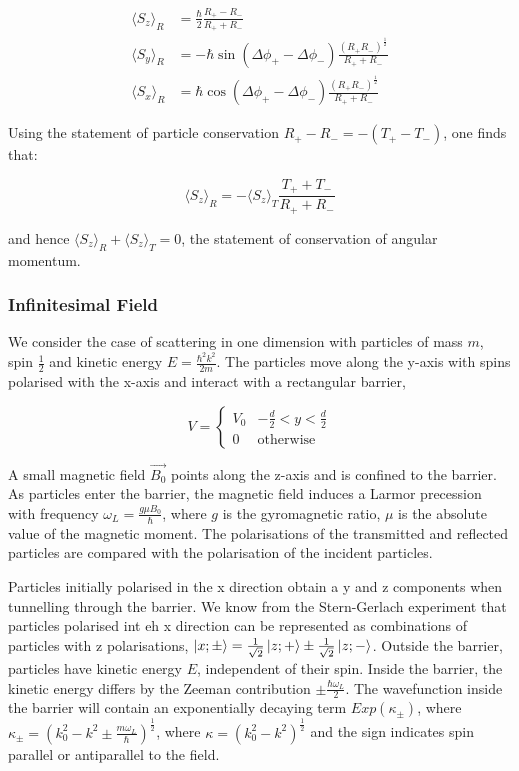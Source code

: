 \documentclass{article}
\begin{document}
\begin{align}
	\langle S_z \rangle_R &= \frac{\hbar}{2}\frac{R_+-R_-}{R_++R_-}\\
	\langle S_y \rangle_R &= -\hbar \sin{(\Delta\phi_+-\Delta\phi_-)}\frac{(R_+R_-)^{\frac{1}{2}}}{R_++R_-}\\
	\langle S_x \rangle_R &= \hbar \cos{(\Delta\phi_+-\Delta\phi_-)}\frac{(R_+R_-)^{\frac{1}{2}}}{R_++R_-}
\end{align}

\noindent Using the statement of particle conservation $R_+-R_-=-(T_+-T_-)$, one finds that:

\begin{equation}
	\langle S_z \rangle_R = -\langle S_z \rangle_T \frac{T_++T_-}{R_++R_-} 
\end{equation}

\noindent and hence $\langle S_z \rangle_R + \langle S_z \rangle_T = 0$, the statement of conservation of angular momentum. 

\subsubsection{Infinitesimal Field}

We consider the case of scattering in one dimension with particles of mass $m$, spin $\frac{1}{2}$ and kinetic energy $
E = \frac{\hbar^2k^2}{2m}$. The particles move along the y-axis with spins polarised with the x-axis and interact with a rectangular barrier,

\begin{equation}
	V = 
	\begin{cases}
	V_0 & -\frac{d}{2}<y<\frac{d}{2}\\
		0 & \text{otherwise}
	\end{cases}
\end{equation}

A small magnetic field $\vec{B_{0}}$ points along the z-axis and is confined to the barrier. As particles enter the barrier, the magnetic field induces a Larmor precession with frequency $\omega_{L}=\frac{g \mu B_{0}}{\hbar}$, where $g$ is the gyromagnetic ratio, $\mu$ is the absolute value of the magnetic moment. The polarisations of the transmitted and reflected particles are compared with the polarisation of the incident particles.

Particles initially polarised in the x direction obtain a y and z components when tunnelling through the barrier. We know from the Stern-Gerlach experiment that particles polarised int eh x direction can be represented as combinations of particles with z polarisations, $\ket{x; \pm} = \frac{1}{\sqrt{2}}\ket{z;+} \pm \frac{1}{\sqrt{2}}\ket{z;-}$. Outside the barrier, particles have kinetic energy $E$, independent of their spin. Inside the barrier, the kinetic energy differs by the Zeeman contribution $\pm \frac{\hbar \omega_{L}}{2}$. The wavefunction inside the barrier will contain an exponentially decaying term $Exp(\kappa_{\pm})$, where $\kappa_{\pm} = (k^{2}_{0}-k^{2} \pm \frac{m \omega_L}{\hbar})^{\frac{1}{2}}$, where $\kappa = (k_{0}^2-k^2)^{\frac{1}{2}}$ and the sign indicates spin parallel or antiparallel to the field.  
\end{document}
